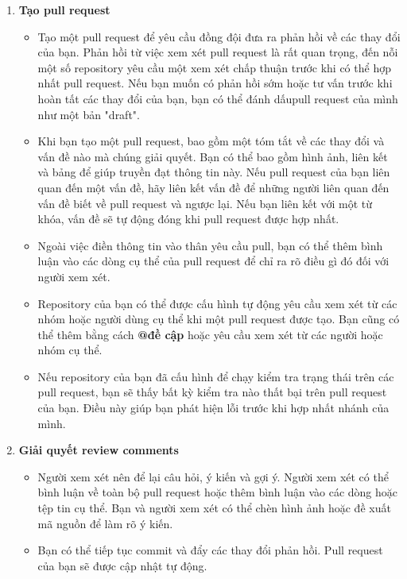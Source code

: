 \begin{enumerate}
    \item \textbf{Tạo pull request}
    \begin{itemize}
        \item Tạo một pull request để yêu cầu đồng đội đưa ra phản hồi về các thay đổi của bạn. Phản hồi từ việc xem xét pull request là rất quan trọng, đến nỗi một số repository yêu cầu một xem xét chấp thuận trước khi có thể hợp nhất pull request. Nếu bạn muốn có phản hồi sớm hoặc tư vấn trước khi hoàn tất các thay đổi của bạn, bạn có thể đánh dấupull request của mình như một bản "draft".

        \item Khi bạn tạo một pull request, bao gồm một tóm tắt về các thay đổi và vấn đề nào mà chúng giải quyết. Bạn có thể bao gồm hình ảnh, liên kết và bảng để giúp truyền đạt thông tin này. Nếu pull request của bạn liên quan đến một vấn đề, hãy liên kết vấn đề để những người liên quan đến vấn đề biết về pull request và ngược lại. Nếu bạn liên kết với một từ khóa, vấn đề sẽ tự động đóng khi pull request được hợp nhất.
    
        \item Ngoài việc điền thông tin vào thân yêu cầu pull, bạn có thể thêm bình luận vào các dòng cụ thể của pull request để chỉ ra rõ điều gì đó đối với người xem xét. 
    
        \item Repository của bạn có thể được cấu hình tự động yêu cầu xem xét từ các nhóm hoặc người dùng cụ thể khi một pull request được tạo. Bạn cũng có thể thêm bằng cách \textbf{@đề cập} hoặc yêu cầu xem xét từ các người hoặc nhóm cụ thể. 
    
        \item Nếu repository của bạn đã cấu hình để chạy kiểm tra trạng thái trên các pull request, bạn sẽ thấy bất kỳ kiểm tra nào thất bại trên pull request của bạn. Điều này giúp bạn phát hiện lỗi trước khi hợp nhất nhánh của mình. 
    \end{itemize}

    \item \textbf{Giải quyết review comments}
    \begin{itemize}
        \item Người xem xét nên để lại câu hỏi, ý kiến và gợi ý. Người xem xét có thể bình luận về toàn bộ pull request hoặc thêm bình luận vào các dòng hoặc tệp tin cụ thể. Bạn và người xem xét có thể chèn hình ảnh hoặc đề xuất mã nguồn để làm rõ ý kiến.
        \item Bạn có thể tiếp tục commit và đẩy các thay đổi phản hồi. Pull request của bạn sẽ được cập nhật tự động.
    \end{itemize}


\end{enumerate}
